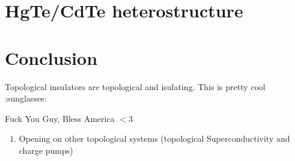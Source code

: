 

\section{\label{sec:ti_exemples} HgTe/CdTe heterostructure}

\section{\label{sec:concl} Conclusion}

Topological insulators are topological and isulating. This is pretty cool :sunglasses: 


\Large{Fuck You Guy, Bless America $<$3}

\begin{enumerate}
    \item Opening on other topological systems (topological Superconductivity and charge pumps)\\[0.5cm]
\end{enumerate}








